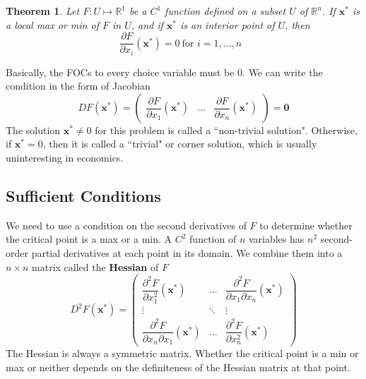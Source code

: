 \documentclass[11pt,a4paper]{book}
\newtheorem{theorem}{Theorem}[section]
\theoremstyle{definition}\newtheorem{definition}{Definition}
\theoremstyle{definition}\newtheorem{fact}{Fact}
\theoremstyle{definition}\newtheorem{remark}{Remark}
\theoremstyle{definition}\newtheorem{ex}{Ex.}
\theoremstyle{definition}\newtheorem{project}{Project}
\theoremstyle{definition}\newtheorem{problem}{Problem}
\theoremstyle{definition}\newtheorem{example}{Example}
\newenvironment{ftheorem}
{\begin{mdframed}\begin{theorem}}
		{\end{theorem}\end{mdframed}}
\numberwithin{theorem}{section}
\numberwithin{corollary}{chapter}
\numberwithin{assumption}{chapter}
\numberwithin{definition}{chapter}
\numberwithin{prop}{chapter}
\numberwithin{notation}{chapter}
\numberwithin{problem}{chapter}
\numberwithin{example}{chapter}
\numberwithin{fact}{chapter}
\numberwithin{ex}{chapter}
\def\R{\mathbb R}
\def\0{\mathbf 0}
\def\R{\mathbb R}
\def\x{\mathbf x}
\begin{document}
	\begin{ftheorem}
		Let $F: U \mapsto \R^1$ be a $C^1$ function defined on a subset $U$ of $\R^n$. If $\x^*$ is a local max or min of $F$ in $U$, and if $\x^*$ is an interior point of $U$, then
		\begin{equation*}
			\frac{\partial F}{\partial x_i} (\x^*) = 0 \ \text{for $i = 1, \dots, n$ }
		\end{equation*}
	\end{ftheorem}
	Basically, the FOCs to every choice variable must be 0. We can write the condition in the form of Jacobian
	\begin{equation*}
		D F(\x^*) = 
		\begin{pmatrix}
			\dfrac{\partial F}{\partial x_1} (\x^*)            & \dots  & \dfrac{\partial F}{ \partial x_n} (\x^*) 
		\end{pmatrix} = \0
	\end{equation*}
	The solution $\x^* \neq 0$ for this problem is called a ``non-trivial solution". Otherwise, if $\x^* = 0$, then it is called a ``trivial" or corner solution, which is usually uninteresting in economics.
	
	\subsection{Sufficient Conditions}
	We need to use a condition on the second derivatives of $F$ to determine whether the critical point is a max or a min. A $C^2$ function of $n$ variables has $n^2$ second-order partial derivatives at each point in its domain. We combine them into a $n\times n$ matrix called the \textbf{Hessian} of $F$
	\begin{equation*}
		D^2 F(\x^*) = 
		\begin{pmatrix}
			\dfrac{\partial^2 F}{\partial x_1^2} (\x^*)            & \dots  & \dfrac{\partial^2 F}{\partial x_1 \partial x_n} (\x^*) \\
			\vdots                                                 & \ddots & \vdots                                                 \\
			\dfrac{\partial^2 F}{\partial x_n \partial x_1} (\x^*) & \dots  & \dfrac{\partial^2 F}{\partial x_n^2} (\x^*)            
		\end{pmatrix}
	\end{equation*}
	The Hessian is always a symmetric matrix. Whether the critical point is a min or max or neither depends on the definiteness of the Hessian matrix at that point.
	
\end{document}
